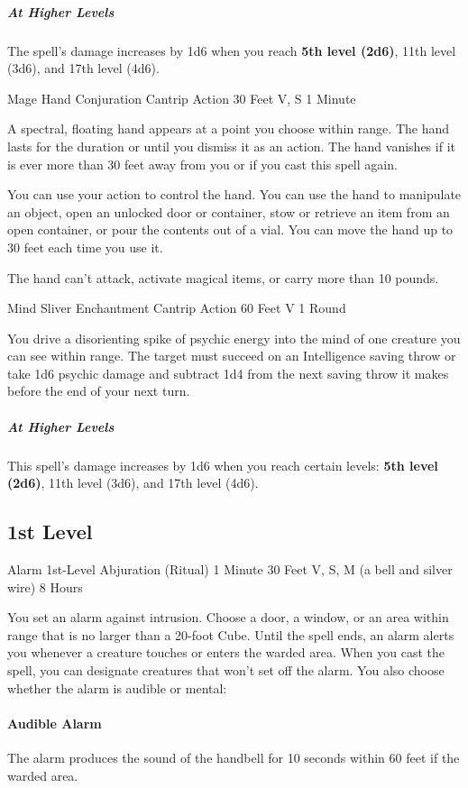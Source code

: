 \documentclass[letterpaper,openany,oneside,twocolumn]{book}
\begin{document}
\subparagraph*{At Higher Levels} The spell's damage increases by 1d6 when you reach \textbf{5th level (2d6)}, 11th level (3d6), and 17th level (4d6).

\DndSpellHeader
  {Mage Hand}
  {Conjuration Cantrip}
  {Action}
  {30 Feet}
  {V, S}
  {1 Minute}

A spectral, floating hand appears at a point you choose within range. The hand lasts for the duration or until you dismiss it as an action. The hand vanishes if it is ever more than 30 feet away from you or if you cast this spell again.

You can use your action to control the hand. You can use the hand to manipulate an object, open an unlocked door or container, stow or retrieve an item from an open container, or pour the contents out of a vial. You can move the hand up to 30 feet each time you use it.

The hand can't attack, activate magical items, or carry more than 10 pounds.

\DndSpellHeader
  {Mind Sliver}
  {Enchantment Cantrip}
  {Action}
  {60 Feet}
  {V}
  {1 Round}

You drive a disorienting spike of psychic energy into the mind of one creature you can see within range. The target must succeed on an Intelligence saving throw or take 1d6 psychic damage and subtract 1d4 from the next saving throw it makes before the end of your next turn.

\subparagraph*{At Higher Levels} This spell's damage increases by 1d6 when you reach certain levels: \textbf{5th level (2d6)}, 11th level (3d6), and 17th level (4d6).

\subsection*{1st Level}

\DndSpellHeader
  {Alarm}
  {1st-Level Abjuration (Ritual)}
  {1 Minute}
  {30 Feet}
  {V, S, M (a bell and silver wire)}
  {8 Hours}

You set an alarm against intrusion. Choose a door, a window, or an area within range that is no larger than a 20-foot Cube. Until the spell ends, an alarm alerts you whenever a creature touches or enters the warded area. When you cast the spell, you can designate creatures that won't set off the alarm. You also choose whether the alarm is audible or mental:
\paragraph*{Audible Alarm} The alarm produces the sound of the handbell for 10 seconds within 60 feet if the warded area.
\end{document}
